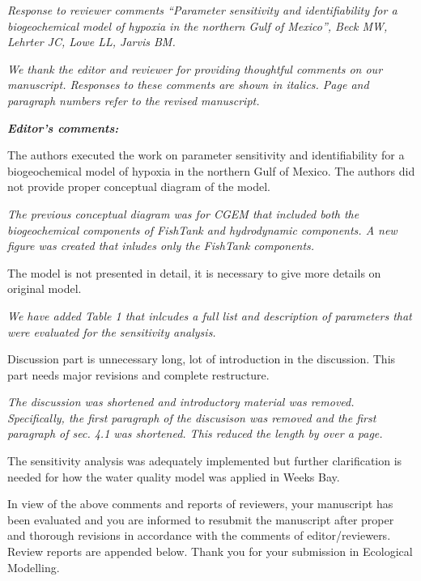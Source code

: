 \documentclass[letterpaper,12pt]{article}\usepackage[]{graphicx}\usepackage[]{color}
\newcommand{\Bigtxt}[1]{\textbf{\textit{#1}}}
\begin{document}
\raggedright


{\it Response to reviewer comments ``Parameter sensitivity and identifiability for a biogeochemical model of hypoxia in the northern Gulf of Mexico'', Beck MW, Lehrter JC, Lowe LL, Jarvis BM.}

{\it We thank the editor and reviewer for providing thoughtful comments on our manuscript.  Responses to these comments are shown in italics.  Page and paragraph numbers refer to the revised manuscript.}

\Bigtxt{Editor's comments:}

The authors executed the work on parameter sensitivity and identifiability for a biogeochemical model of hypoxia in the northern Gulf of Mexico. The authors did not provide proper conceptual diagram of the model.  

{\it The previous conceptual diagram was for CGEM that included both the biogeochemical components of FishTank and hydrodynamic components.  A new figure was created that inludes only the FishTank components.  }

The model is not presented in detail, it is necessary to give more details on original model. 

{\it We have added Table 1 that inlcudes a full list and description of parameters that were evaluated for the sensitivity analysis.}

Discussion part is unnecessary long, lot of introduction in the discussion. This part needs major revisions and complete restructure. 

{\it The discussion was shortened and introductory material was removed.  Specifically, the first paragraph of the discusison was removed and the first paragraph of sec. 4.1 was shortened.  This reduced the length by over a page.}

The sensitivity analysis was adequately implemented but further clarification is needed for how the water quality model was applied in Weeks Bay. 

{\it }

In view of the above comments and reports of reviewers, your manuscript has been evaluated and you are informed to resubmit the manuscript after proper and thorough revisions in accordance with the comments of editor/reviewers. Review reports are appended below. Thank you for your submission in Ecological Modelling. 
\end{document}
